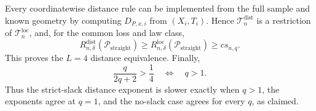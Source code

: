 Every coordinatewise distance rule can be implemented from the full sample and known geometry by computing \(D_{P,x,i}\) from \((X_i,T_i)\).  Hence \(\mathcal T_n^{\mathrm{dist}}\) is a restriction of \(\mathcal T_n^{\mathrm{loc}}\), and, for the common loss and law class,
\[
 R_{n,\delta}^{\mathrm{dist}}(\mathcal P_{\mathrm{straight}})
 \geq R_{n,\delta}^{\mathrm{loc}}(\mathcal P_{\mathrm{straight}})
 \geq cs_{n,q}.
\]
This proves the \(L=4\) distance equivalence.  Finally,
\[
 \frac{q}{2q+2}>\frac14
 \quad\Longleftrightarrow\quad q>1.
\]
Thus the strict-slack distance exponent is slower exactly when \(q>1\), the exponents agree at \(q=1\), and the no-slack case agrees for every \(q\), as claimed.